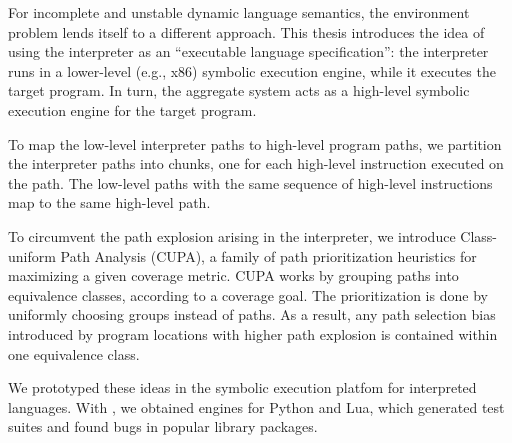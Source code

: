 

For incomplete and unstable dynamic language semantics, the environment problem lends itself to a different approach.
%
This thesis introduces the idea of using the interpreter as an ``executable language specification'': the interpreter runs in a lower-level (e.g., x86) symbolic execution engine, while it executes the target program.  In turn, the aggregate system acts as a high-level symbolic execution engine for the target program.


To map the low-level interpreter paths to high-level program paths, we partition the interpreter paths into chunks, one for each high-level instruction executed on the path. The low-level paths with the same sequence of high-level instructions map to the same high-level path.

To circumvent the path explosion arising in the interpreter, we introduce Class-uniform Path Analysis (CUPA), a family of path prioritization heuristics for maximizing a given coverage metric.
%
CUPA works by grouping paths into equivalence classes, according to a coverage goal.  The prioritization is done by uniformly choosing groups instead of paths.  As a result, any path selection bias introduced by program locations with higher path explosion is contained within one equivalence class.



We prototyped these ideas in the \chef symbolic execution platfom for interpreted languages.  With \chef, we obtained engines for Python and Lua, which generated test suites and found bugs in popular library packages.

